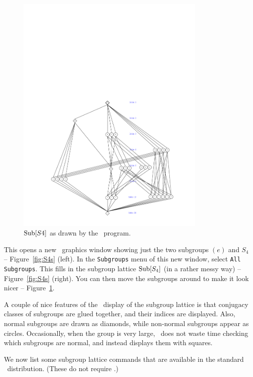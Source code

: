 \begin{figure}[!h]
  \begin{center}
    \vspace{-4cm}
    \includegraphics[height=12cm]{neatS4.pdf}%
    \caption{$\operatorname{Sub}[S4]$ as drawn by the \xgap\ program.}
    \label{fig:neatS4}
  \end{center}
\end{figure}
This opens a new \xgap\ graphics window showing just the two subgroups $(e)$ and
$S_4$ -- Figure~\ref{fig:S4s} (left).  In
the {\tt Subgroups} menu of this new window, select {\tt All Subgroups}.  This
fills in the subgroup lattice $\operatorname{Sub}[S_4]$ (in a rather messy way) -- Figure~\ref{fig:S4s}
(right).  You can then move the subgroups around to make it look nicer --
Figure~\ref{fig:neatS4}. 

A couple of nice features of the \xgap\ display of the
subgroup lattice is that conjugacy classes of subgroups are glued together, and
their indices are displayed.  Also, normal subgroups are drawn as diamonds, while
non-normal subgroups appear as circles.  Occasionally, when the group is very
large, \xgap\ does not waste time checking which subgroups are normal, and
instead displays them with squares.

We now list some subgroup lattice commands that are available in the standard
\gap\ distribution.  (These do not require \xgap.)

